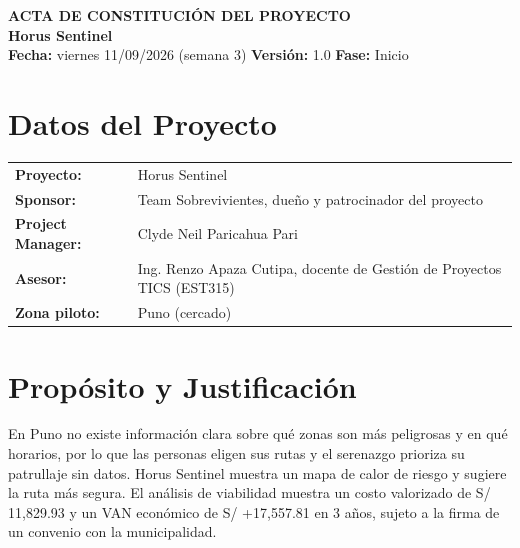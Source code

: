 \documentclass[11pt,a4paper]{article}
\begin{document}
\begin{center}
    {\Large \textbf{\textcolor{AzulUNA}{ACTA DE CONSTITUCIÓN DEL PROYECTO}}}\\[3pt]
    {\normalsize \textbf{Horus Sentinel}}\\[4pt]
    \footnotesize \textbf{Fecha:} viernes 11/09/2026 (semana 3) \quad \textbar\quad \textbf{Versión:} 1.0 \quad \textbar\quad \textbf{Fase:} Inicio
\end{center}

\vspace{0.1cm}

\section{Datos del Proyecto}
\noindent\begin{tabularx}{\textwidth}{@{}P{4.2cm} L@{}}
\toprule
\textbf{Proyecto:} & Horus Sentinel \\
\textbf{Sponsor:} & Team Sobrevivientes, dueño y patrocinador del proyecto \\
\textbf{Project Manager:} & Clyde Neil Paricahua Pari \\
\textbf{Asesor:} & Ing. Renzo Apaza Cutipa, docente de Gestión de Proyectos TICS (EST315) \\
\textbf{Zona piloto:} & Puno (cercado) \\
\bottomrule
\end{tabularx}

\section{Propósito y Justificación}
En Puno no existe información clara sobre qué zonas son más peligrosas y en qué horarios, por lo que las personas eligen sus rutas y el serenazgo prioriza su patrullaje sin datos. Horus Sentinel muestra un mapa de calor de riesgo y sugiere la ruta más segura. El análisis de viabilidad muestra un costo valorizado de S/ 11,829.93 y un VAN económico de S/ +17,557.81 en 3 años, sujeto a la firma de un convenio con la municipalidad.
\end{document}

